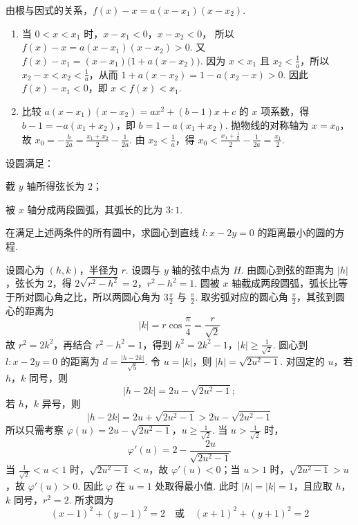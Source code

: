 \begin{solution}
由根与因式的关系，\(f(x)-x=a(x-x_{1})(x-x_{2})\).
\begin{enumerate}
\item 当 \(0<x<x_{1}\) 时，\(x-x_{1}<0\)，\(x-x_{2}<0\)，
所以 \(f(x)-x=a(x-x_{1})(x-x_{2})>0\). 又 \(f(x)-x_{1}=(x-x_{1})\bigl(1+a(x-x_{2})\bigr)\).
因为 \(x<x_{1}\) 且 \(x_{2}<\frac{1}{a}\)，所以 \(x_{2}-x<x_{2}<\frac{1}{a}\)，从而 \(1+a(x-x_{2})=1-a(x_{2}-x)>0\). 因此 \(f(x)-x_{1}<0\)，即 \(x<f(x)<x_{1}\).
\item 比较
\(a(x-x_{1})(x-x_{2})=ax^{2}+(b-1)x+c\)
的 \(x\) 项系数，得 \(b-1=-a(x_{1}+x_{2})\)，即 \(b=1-a(x_{1}+x_{2})\). 抛物线的对称轴为 \(x=x_{0}\)，故
\(x_{0}=-\frac{b}{2a}=\frac{x_{1}+x_{2}}{2}-\frac{1}{2a}\).
由 \(x_{2}<\frac{1}{a}\)，得
\(x_{0}<\frac{x_{1}+\frac{1}{a}}{2}-\frac{1}{2a}=\frac{x_{1}}{2}\).
\end{enumerate}
\end{solution}

\begin{problem}
设圆满足：

\begin{circlelist}
\item 截 \(y\) 轴所得弦长为 \(2\)；
\item 被 \(x\) 轴分成两段圆弧，其弧长的比为 \(3:1\).
\end{circlelist}

在满足上述两条件的所有圆中，求圆心到直线 \(l\colon x - 2y = 0\) 的距离最小的圆的方程.
\end{problem}

\begin{solution}
设圆心为 \((h,k)\)，半径为 \(r\). 设圆与 \(y\) 轴的弦中点为 \(H\). 由圆心到弦的距离为 \(|h|\)，弦长为 \(2\)，得
\(2\sqrt{r^{2}-h^{2}}=2\)，\(r^{2}-h^{2}=1\).
圆被 \(x\) 轴截成两段圆弧，弧长比等于所对圆心角之比，所以两圆心角为 \(3\frac{\pi}{2}\) 与 \(\frac{\pi}{2}\). 取劣弧对应的圆心角 \(\frac{\pi}{2}\)，其弦到圆心的距离为
\[
|k|=r\cos\frac{\pi}{4}=\frac{r}{\sqrt2}
\]
故 \(r^{2}=2k^{2}\)，再结合 \(r^{2}-h^{2}=1\)，得到
\(h^{2}=2k^{2}-1\)，\(|k|\geqslant\frac1{\sqrt2}\).
圆心到 \(l:x-2y=0\) 的距离为 \(d=\frac{|h-2k|}{\sqrt5}\). 令 \(u=|k|\)，则 \(|h|=\sqrt{2u^{2}-1}\). 对固定的 \(u\)，若 \(h\)，\(k\) 同号，则
\[
|h-2k|=2u-\sqrt{2u^{2}-1};
\]
若 \(h\)，\(k\) 异号，则
\[
|h-2k|=2u+\sqrt{2u^{2}-1}>2u-\sqrt{2u^{2}-1}
\]
所以只需考察
\(\varphi(u)=2u-\sqrt{2u^{2}-1}\)，\(u\geqslant\frac1{\sqrt2}\).
当 \(u>\frac1{\sqrt2}\) 时，
\[
\varphi'(u)=2-\frac{2u}{\sqrt{2u^{2}-1}}
\]
当 \(\frac1{\sqrt2}<u<1\) 时，\(\sqrt{2u^{2}-1}<u\)，故 \(\varphi'(u)<0\)；当 \(u>1\) 时，\(\sqrt{2u^{2}-1}>u\)，故 \(\varphi'(u)>0\). 因此 \(\varphi\) 在 \(u=1\) 处取得最小值. 此时 \(|h|=|k|=1\)，且应取 \(h\)，\(k\) 同号，\(r^{2}=2\). 所求圆为
\[
(x-1)^{2}+(y-1)^{2}=2\quad\text{或}\quad (x+1)^{2}+(y+1)^{2}=2
\]
\end{solution}
